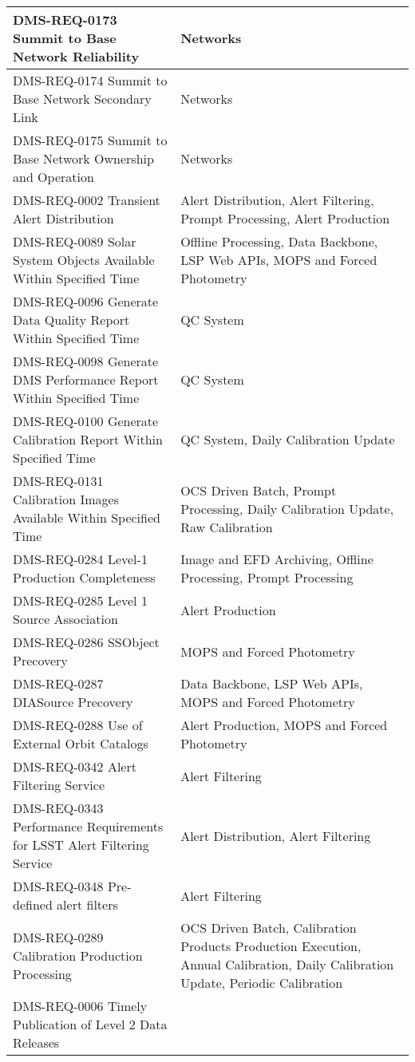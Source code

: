 \begin{xtabular}{p{0.4\textwidth}p{0.55\textwidth}}
DMS-REQ-0173 Summit to Base Network Reliability &
Networks\\ \hline
DMS-REQ-0174 Summit to Base Network Secondary Link &
Networks\\ \hline
DMS-REQ-0175 Summit to Base Network Ownership and Operation &
Networks\\ \hline
DMS-REQ-0002 Transient Alert Distribution & Alert Distribution, Alert
Filtering, Prompt Processing, Alert Production\\ \hline
DMS-REQ-0089 Solar System Objects Available Within Specified Time &
Offline Processing, Data Backbone, LSP Web APIs, MOPS and Forced
Photometry\\ \hline
DMS-REQ-0096 Generate Data Quality Report Within Specified Time & QC
System\\ \hline
DMS-REQ-0098 Generate DMS Performance Report Within Specified Time & QC
System\\ \hline
DMS-REQ-0100 Generate Calibration Report Within Specified Time & QC
System, Daily Calibration Update\\ \hline
DMS-REQ-0131 Calibration Images Available Within Specified Time & OCS
Driven Batch, Prompt Processing, Daily Calibration Update, Raw
Calibration\\ \hline
DMS-REQ-0284 Level-1 Production Completeness & Image and EFD Archiving,
Offline Processing, Prompt Processing\\ \hline
DMS-REQ-0285 Level 1 Source Association & Alert
Production\\ \hline
DMS-REQ-0286 SSObject Precovery & MOPS and Forced
Photometry\\ \hline
DMS-REQ-0287 DIASource Precovery & Data Backbone, LSP Web APIs, MOPS
and Forced Photometry\\ \hline
DMS-REQ-0288 Use of External Orbit Catalogs & Alert Production, MOPS and
Forced Photometry\\ \hline
DMS-REQ-0342 Alert Filtering Service & Alert Filtering\\ \hline
DMS-REQ-0343 Performance Requirements for LSST Alert Filtering Service &
Alert Distribution, Alert Filtering\\ \hline
DMS-REQ-0348 Pre-defined alert filters & Alert Filtering\\ \hline
DMS-REQ-0289 Calibration Production Processing & OCS Driven Batch,
Calibration Products Production Execution, Annual Calibration, Daily
Calibration Update, Periodic Calibration\\ \hline
DMS-REQ-0006 Timely Publication of Level 2 Data Releases

\end{xtabular}
